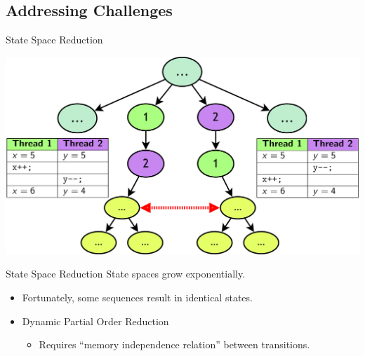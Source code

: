 \documentclass[xcolor=dvipsnames]{beamer}
\begin{document}
\subsection{Addressing Challenges} %

\begin{frame}{State Space Reduction}
	\begin{center}
	\includegraphics[width=\textwidth]{undiamond1.png}
	\end{center}
\end{frame}
\begin{frame}{State Space Reduction}
	State spaces grow exponentially.
	\begin{itemize}
		\item Fortunately, some sequences result in identical states.
		\item Dynamic Partial Order Reduction
		\begin{itemize}
			\item Requires ``memory independence relation'' between transitions.
		\end{itemize}
	\end{itemize}
\end{frame}
\end{document}
